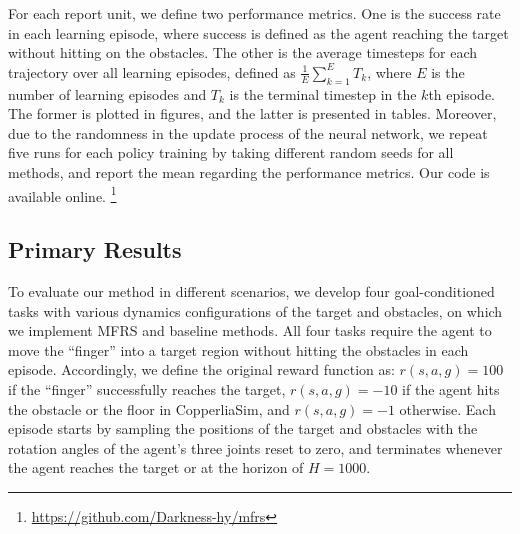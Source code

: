 \documentclass[journal]{IEEEtran}
\begin{document}
For each report unit, we define two performance metrics.
One is the success rate in each learning episode, where success is defined as the agent reaching the target without hitting on the obstacles.
The other is the average timesteps for each trajectory over all learning episodes, defined as $\frac{1}{E}\sum_{k=1}^{E}T_{k}$, where $E$ is the number of learning episodes and $T_{k}$ is the terminal timestep in the $k$th episode.
The former is plotted in figures, and the latter is presented in tables.
Moreover, due to the randomness in the update process of the neural network, we repeat five runs for each policy training by taking different random seeds for all methods, and report the mean regarding the performance metrics.
Our code is available online.
\footnote{\href{https://github.com/Darkness-hy/mfrs}{https://github.com/Darkness-hy/mfrs}}


\subsection{Primary Results}\label{compare-exp}
To evaluate our method in different scenarios, we develop four goal-conditioned tasks with various dynamics configurations of the target and obstacles, on which we implement MFRS and baseline methods.
All four tasks require the agent to move the ``finger'' into a target region without hitting the obstacles in each episode.
Accordingly, we define the original reward function as: $r(s,a,g)=100$ if the ``finger'' successfully reaches the target, $r(s,a,g)=-10$ if the agent hits the obstacle or the floor in CopperliaSim, and $r(s,a,g)=-1$ otherwise.
Each episode starts by sampling the positions of the target and obstacles with the rotation angles of the agent's three joints reset to zero, and terminates whenever the agent reaches the target or at the horizon of $H=1000$.
\end{document}
